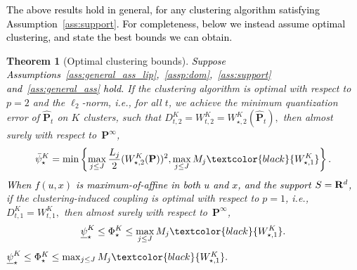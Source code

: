 \documentclass[12pt]{article}
\newcommand{\ie}{{\it i.e.}}
\newcommand{\reals}{{\bf R}}
\newcommand{\prob}{{\mathbf P}}
\newcommand{\supp}{S}
\newcommand{\barp}{p}
\newcommand{\ld}{W}
\newtheorem{theorem}{Theorem}[section]  %
\newcommand{\RC}[1]{\textcolor{black}{#1}}
\newcommand{\RC}[1]{\textcolor{blue}{#1}}
\begin{document}
\RC{The above results hold in general, for any clustering algorithm satisfying Assumption~\ref{ass:support}. 
For completeness, below we instead assume optimal clustering, and state the best bounds we can obtain.
}

\begin{theorem}[Optimal clustering bounds]
\label{cor:opt_cluster}
\RC{Suppose Assumptions~\ref{ass:general_ass_lip},~\ref{assp:dom},~\ref{ass:support} and~\ref{ass:general_ass} hold.}
 If the clustering algorithm is optimal with respect to $\barp=2$ and the $\ell_2$-norm, \ie, for all $t$, we achieve the minimum quantization error of $\hat{\prob}_t$ on $K$ clusters, such that
    $D^K_{t,2} = \ld^K_{t,2}=\ld^K_{\star,2}(\hat{\prob}_t),$
 then almost surely with respect to~$\prob^{\infty}$,
\begin{equation*}
    \bar{\psi}_\star^K =  \min \left\{{\max_{j \leq J}\frac{L_j}{2}}(\ld^K_{\star,2}(\prob))^2,\max_{j\leq J}M_j\RC{\ld^K_{\star,1}}\right\}.\end{equation*}
\RC{When $f(u,x)$ is maximum-of-affine in both $u$ and $x$, and the support $\supp = \reals^d$,} if the clustering-induced coupling is optimal with respect to $\barp=1$, \ie,
    $ D^K_{t,1} = \ld^K_{t,1}, $
   then almost surely with respect to~$\prob^{\infty}$,
   \ifpreprint
\begin{equation*} 
\begin{aligned} 
   {\underline{\psi}_\star^K \leq \Phi^K_\star}\leq
        \max_{j\leq J}M_j\RC{\ld^K_{\star,1}}.
\end{aligned}
\end{equation*}
\else $\underline{\psi}_\star^K \leq {\Phi^K_\star}\leq
        \max_{j\leq J}M_j\RC{\ld^K_{\star,1}}.$\fi
\end{theorem}
\end{document}
